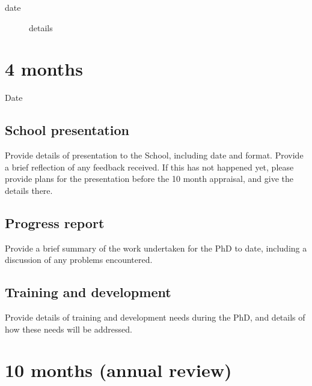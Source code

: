 \documentclass[12pt,a4paper]{article}
\begin{document}

\begin{description}
	\item[date] details
\end{description}


\section{4 months}

\begin{description}
	\item[Date] %
\end{description}

\subsection{School presentation}
Provide details of presentation to the School, including date and format. Provide a brief reflection of any feedback received. If this has not happened yet, please provide plans for the presentation before the 10 month appraisal, and give the details there.

\subsection{Progress report}
Provide a brief summary of the work undertaken for the PhD to date, including a discussion of any problems encountered. %

\subsection{Training and development}
Provide details of training and development needs during the PhD, and details of how these needs will be addressed. %

\section{10 months (annual review)}
\end{document}
